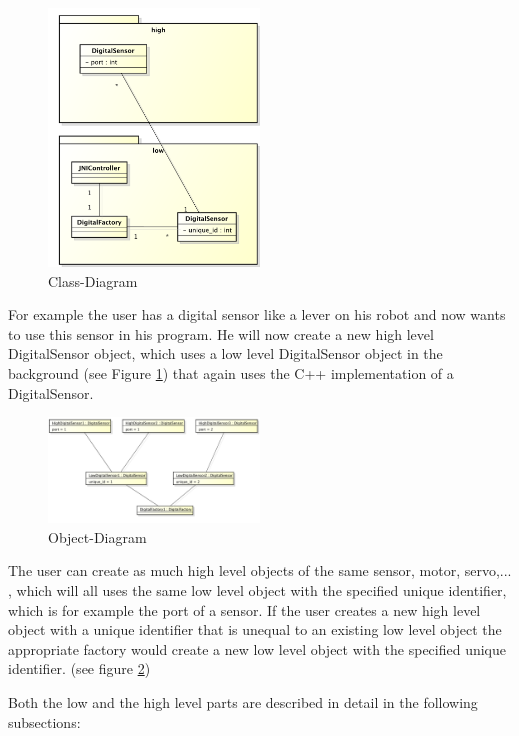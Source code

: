 \documentclass{juniorjournal}
\begin{document}
\begin{figure}[H]
\centering
\includegraphics[width=0.5\textwidth]{images/Class-Diagram.pdf}
\caption{Class-Diagram}
\label{fig:Class-Diagram}
\end{figure}

For example the user has a digital sensor like a lever on his robot and now 
wants to use this sensor in his program. He will now create a new high level 
DigitalSensor object, which uses a low level DigitalSensor object in the 
background (see Figure \ref{fig:Class-Diagram}) that again uses the C++ implementation of a DigitalSensor.

\begin{figure}[H]
\centering
\includegraphics[width=0.5\textwidth]{images/Object-Diagram.pdf}
\caption{Object-Diagram}
\label{fig:Object-Diagram}
\end{figure}

The user can create as much high level objects of the same sensor, motor, 
servo,... , which will all uses the same low level object with the specified 
unique identifier, which is for example the port of a sensor. If the user 
creates a new high level object with a unique identifier that is unequal to 
an existing low level object the appropriate factory would 
create a new low level object with the specified unique identifier. (see figure \ref{fig:Object-Diagram})

Both the low and the high level parts are described in detail in the following subsections:
\end{document}
